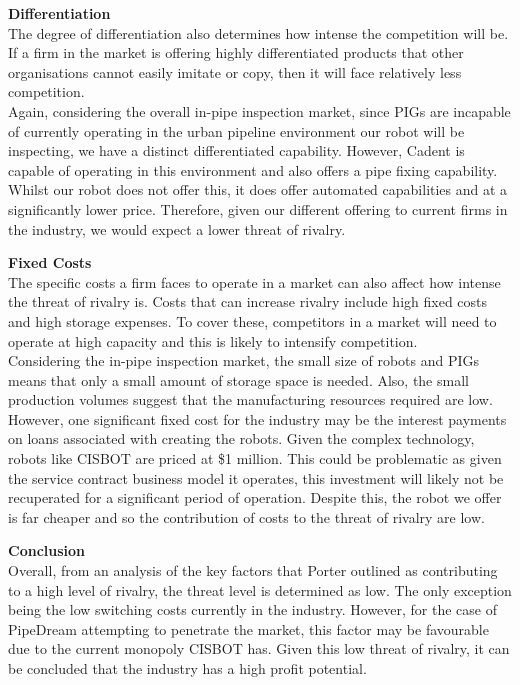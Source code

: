 \documentclass[11pt]{article}		%
\begin{document}
		        \textbf{Differentiation}\\
		        The degree of differentiation also determines how intense the competition will be. If a firm in the market is offering highly differentiated products that other organisations cannot easily imitate or copy, then it will face relatively less competition.\\
		        \hspace*{3ex}Again, considering the overall in-pipe inspection market, since PIGs are incapable of currently operating in the urban pipeline environment our robot will be inspecting, we have a distinct differentiated capability. However, Cadent is capable of operating in this environment and also offers a pipe fixing capability. Whilst our robot does not offer this, it does offer automated capabilities and at a significantly lower price. Therefore, given our different offering to current firms in the industry, we would expect a lower threat of rivalry. 
		        
		        \textbf{Fixed Costs}\\
		        The specific costs a firm faces to operate in a market can also affect how intense the threat of rivalry is. Costs that can increase rivalry include high fixed costs and high storage expenses. To cover these, competitors in a market will need to operate at high capacity and this is likely to intensify competition.\\
		        \hspace*{3ex}Considering the in-pipe inspection market, the small size of robots and PIGs means that only a small amount of storage space is needed. Also, the small production volumes suggest that the manufacturing resources required are low. However, one significant fixed cost for the industry may be the interest payments on loans associated with creating the robots. Given the complex technology, robots like CISBOT are priced at \$1 million. This could be problematic as given the service contract business model it operates, this investment will likely not be recuperated for a significant period of operation. Despite this, the robot we offer is far cheaper and so the contribution of costs to the threat of rivalry are low. 
		        
		        \textbf{Conclusion}\\
		        Overall, from an analysis of the key factors that Porter outlined as contributing to a high level of rivalry, the threat level is determined as low. The only exception being the low switching costs currently in the industry. However, for the case of PipeDream attempting to penetrate the market, this factor may be favourable due to the current monopoly CISBOT has. Given this low threat of rivalry, it can be concluded that the industry has a high profit potential.
    
\end{document}
